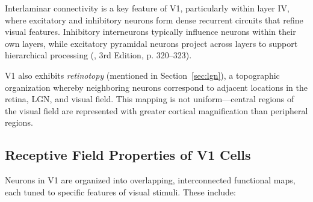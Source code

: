 Interlaminar connectivity is a key feature of V1, particularly within layer IV, where excitatory and inhibitory neurons form dense recurrent circuits that refine visual features. Inhibitory interneurons typically influence neurons within their own layers, while excitatory pyramidal neurons project across layers to support hierarchical processing (\citet{bear2020neuroscience}, 3rd Edition, p. 320--323).

V1 also exhibits \emph{retinotopy} (mentioned in Section~\ref{sec:lgn}), a topographic organization whereby neighboring neurons correspond to adjacent locations in the retina, LGN, and visual field. This mapping is not uniform—central regions of the visual field are represented with greater cortical magnification than peripheral regions.

\subsection{Receptive Field Properties of V1 Cells}
\label{subsec:receptive_field}

Neurons in V1 are organized into overlapping, interconnected functional maps, each tuned to specific features of visual stimuli. These include:

